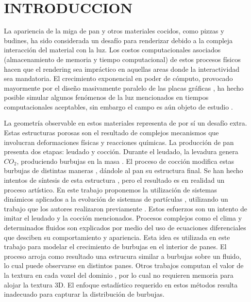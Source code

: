 \documentclass[oneside,a4paper,spanish,links]{amca}
\begin{document}
\section{INTRODUCCION}

La apariencia de la miga de pan y otros materiales cocidos, como pizzas y budines, ha sido considerada un desaf\'io para renderizar debido a la compleja interacci\'on del material con la luz. Los costos computacionales asociados (almacenamiento de memoria y tiempo computacional) de estos procesos f\'isicos hacen que el rendering sea impr\'actico en aquellas areas donde la interactividad sea mandatoria. El crecimiento exponencial en poder de c\'omputo, provocado mayormente por el dise\~no masivamente paralelo de las placas gr\'aficas \citep{Yeo09,Harris06}, ha hecho posible simular algunos fen\'omenos de la luz mencionados en tiempos computacionales aceptables, sin embargo el campo es a\'un objeto de estudio \citep{Voglsam2013}.

La geometr\'ia observable en estos materiales representa de por s\'i un desaf\'io extra. Estas estructuras porosas son el resultado de complejos mecanismos que involucran deformaciones f\'isicas y reacciones qu\'imicas. La producci\'on de pan presenta dos etapas: leudado y cocci\'on. Durante el leudado, la levadura genera $CO_{2}$, produciendo burbujas en la masa \citep{Shah1998}. El proceso de cocci\'on \citep{Mondal2008} modifica estas burbujas de distintas maneras \citep{Scanlon2001}, d\'andole al pan su estructura final. Se han hecho intentos de s\'intesis de esta estructura \citep{Cho2007}, pero el resultado es en realidad un proceso art\'istico. En este trabajo proponemos la utilizaci\'on de sistemas din\'amicos \citep{Strogatz2001} aplicados a la evoluci\'on de sistemas de part\'iculas \citep{Reeves83}, utilizando un trabajo que los autores realizaron previamente \citep{Baravalle2011}. Estos esfuerzos son un intento de imitar el leudado y la cocci\'on mencionados. Procesos complejos como el clima y determinados fluidos son explicados por medio del uso de ecuaciones diferenciales que desciben su comportamiento y apariencia. Esta idea es utilizada en este trabajo para modelar el crecimiento de burbujas en el interior de panes. El proceso arroja como resultado una estrucura similar a burbujas sobre un fluido, lo cual puede observarse en distintos panes. Otros trabajos computan el valor de la textura en cada voxel del dominio \citep{Perlin1989}, por lo cual no requieren memoria para alojar la textura 3D. El enfoque estad\'istico requerido en estos m\'etodos resulta inadecuado para capturar la distribuci\'on de burbujas.
\end{document}
